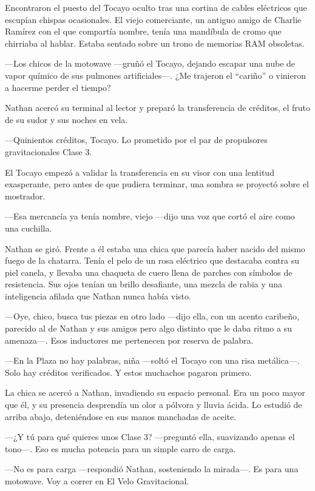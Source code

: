 \documentclass[12pt,a4paper]{book}
\begin{document}
Encontraron el puesto del Tocayo oculto tras una cortina de cables eléctricos que escupían chispas ocasionales. El viejo comerciante, un antiguo amigo de Charlie Ramírez con el que compartía nombre, tenía una mandíbula de cromo que chirriaba al hablar. Estaba sentado sobre un trono de memorias RAM obsoletas.

---Los chicos de la motowave ---gruñó el Tocayo, dejando escapar una nube de vapor químico de sus pulmones artificiales---. ¿Me trajeron el ``cariño'' o vinieron a hacerme perder el tiempo?

Nathan acercó su terminal al lector y preparó la transferencia de créditos, el fruto de su sudor y sus noches en vela.

---Quinientos créditos, Tocayo. Lo prometido por el par de propulsores gravitacionales Clase 3.

El Tocayo empezó a validar la transferencia en su visor con una lentitud exasperante, pero antes de que pudiera terminar, una sombra se proyectó sobre el mostrador.

---Esa mercancía ya tenía nombre, viejo ---dijo una voz que cortó el aire como una cuchilla.

Nathan se giró. Frente a él estaba una chica que parecía haber nacido del mismo fuego de la chatarra. Tenía el pelo de un rosa eléctrico que destacaba contra su piel canela, y llevaba una chaqueta de cuero llena de parches con símbolos de resistencia. Sus ojos tenían un brillo desafiante, una mezcla de rabia y una inteligencia afilada que Nathan nunca había visto.

---Oye, chico, busca tus piezas en otro lado ---dijo ella, con un acento caribeño, parecido al de Nathan y sus amigos pero algo distinto que le daba ritmo a su amenaza---. Esos inductores me pertenecen por reserva de palabra.

---En la Plaza no hay palabras, niña ---soltó el Tocayo con una risa metálica---. Solo hay créditos verificados. Y estos muchachos pagaron primero.

La chica se acercó a Nathan, invadiendo su espacio personal. Era un poco mayor que él, y su presencia desprendía un olor a pólvora y lluvia ácida. Lo estudió de arriba abajo, deteniéndose en sus manos manchadas de aceite.

---¿Y tú para qué quieres unos Clase 3? ---preguntó ella, suavizando apenas el tono---. Eso es mucha potencia para un simple carro de carga.

---No es para carga ---respondió Nathan, sosteniendo la mirada---. Es para una motowave. Voy a correr en El Velo Gravitacional.
\end{document}
